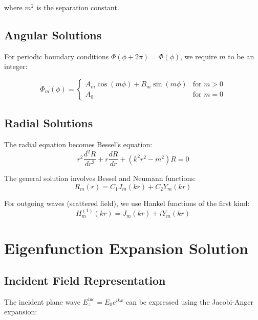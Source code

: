 \documentclass[11pt,a4paper]{article}
\begin{document}
where $m^2$ is the separation constant.

\subsection{Angular Solutions}

For periodic boundary conditions $\Phi(\phi + 2\pi) = \Phi(\phi)$, we require $m$ to be an integer:

\begin{equation}
\Phi_m(\phi) = \begin{cases}
A_m \cos(m\phi) + B_m \sin(m\phi) & \text{for } m > 0 \\
A_0 & \text{for } m = 0
\end{cases} \label{eq:angular_solutions}
\end{equation}

\subsection{Radial Solutions}

The radial equation becomes Bessel's equation:
\begin{equation}
r^2 \frac{d^2R}{dr^2} + r \frac{dR}{dr} + (k^2r^2 - m^2)R = 0 \label{eq:bessel_equation}
\end{equation}

The general solution involves Bessel and Neumann functions:
\begin{equation}
R_m(r) = C_1 J_m(kr) + C_2 Y_m(kr) \label{eq:radial_general}
\end{equation}

For outgoing waves (scattered field), we use Hankel functions of the first kind:
\begin{equation}
H_m^{(1)}(kr) = J_m(kr) + iY_m(kr) \label{eq:hankel_function}
\end{equation}

\section{Eigenfunction Expansion Solution}

\subsection{Incident Field Representation}

The incident plane wave $E_z^{\text{inc}} = E_0 e^{ikx}$ can be expressed using the Jacobi-Anger expansion:
\end{document}
